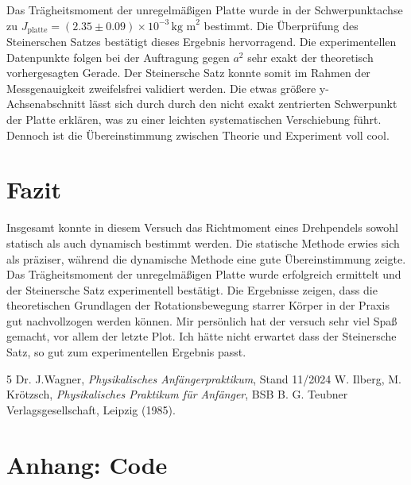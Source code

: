 \documentclass[12pt,a4paper,titlepage]{scrartcl}
\numberwithin{equation}{section}
\numberwithin{table}{section}
\numberwithin{figure}{section}
\begin{document}
Das Trägheitsmoment der unregelmäßigen Platte wurde in der Schwerpunktachse zu $J_\text{platte} = (2.35 \pm 0.09) \times 10^{-3} \, \text{kg m}^2$ bestimmt. Die Überprüfung des Steinerschen Satzes bestätigt dieses Ergebnis hervorragend. Die experimentellen Datenpunkte folgen bei der Auftragung gegen $a^2$ sehr exakt der theoretisch vorhergesagten Gerade. Der Steinersche Satz konnte somit im Rahmen der Messgenauigkeit zweifelsfrei validiert werden. Die etwas größere y-Achsenabschnitt lässt sich durch durch den nicht exakt zentrierten Schwerpunkt der Platte erklären, was zu einer leichten systematischen Verschiebung führt. Dennoch ist die Übereinstimmung zwischen Theorie und Experiment voll cool.

\section{Fazit}
Insgesamt konnte in diesem Versuch das Richtmoment eines Drehpendels sowohl statisch als auch dynamisch bestimmt werden. Die statische Methode erwies sich als präziser, während die dynamische Methode eine gute Übereinstimmung zeigte. Das Trägheitsmoment der unregelmäßigen Platte wurde erfolgreich ermittelt und der Steinersche Satz experimentell bestätigt. Die Ergebnisse zeigen, dass die theoretischen Grundlagen der Rotationsbewegung starrer Körper in der Praxis gut nachvollzogen werden können. Mir persönlich hat der versuch sehr viel Spaß gemacht, vor allem der letzte Plot. Ich hätte nicht erwartet dass der Steinersche Satz, so gut zum experimentellen Ergebnis passt.

\clearpage

\listoffigures


\listoftables

\begin{thebibliography}{5}
     Dr. J.Wagner, \emph{Physikalisches Anfängerpraktikum}, Stand 11/2024
     W. Ilberg, M. Krötzsch, \emph{Physikalisches Praktikum für Anfänger}, BSB B. G. Teubner Verlagsgesellschaft, Leipzig (1985).
\end{thebibliography}


\appendix
\section{Anhang: Code}


\end{document}

